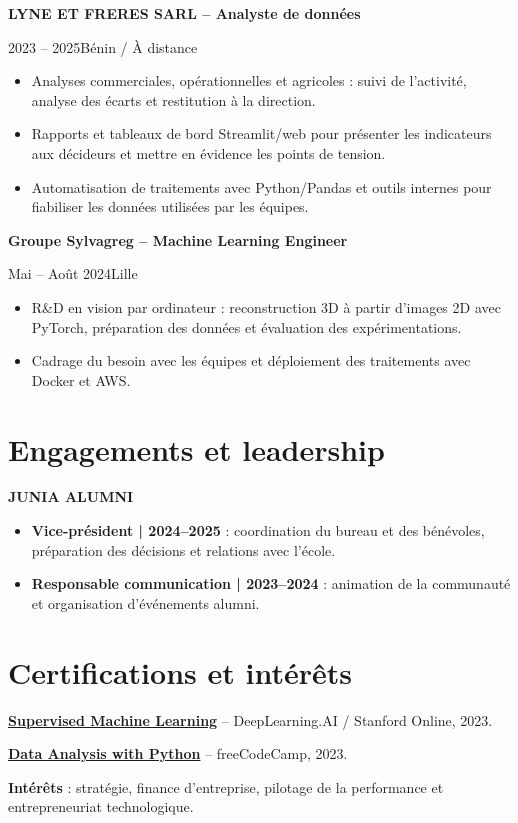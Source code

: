 \documentclass[10pt,a4paper]{article}
\newcommand{\role}[3]{\vspace{4pt}\textbf{#1}\par {\color{muted}#2\enspace\textbullet\enspace #3}\par}
\begin{document}
{\begin{minipage}[t]{0.68\textwidth}
\role{LYNE ET FRERES SARL -- Analyste de données}{2023 -- 2025}{Bénin / À distance}
\begin{itemize}
\item Analyses commerciales, opérationnelles et agricoles : suivi de l'activité, analyse des écarts et restitution à la direction.
\item Rapports et tableaux de bord Streamlit/web pour présenter les indicateurs aux décideurs et mettre en évidence les points de tension.
\item Automatisation de traitements avec Python/Pandas et outils internes pour fiabiliser les données utilisées par les équipes.
\end{itemize}

\role{Groupe Sylvagreg -- Machine Learning Engineer}{Mai -- Août 2024}{Lille}
\begin{itemize}
\item R\&D en vision par ordinateur : reconstruction 3D à partir d'images 2D avec PyTorch, préparation des données et évaluation des expérimentations.
\item Cadrage du besoin avec les équipes et déploiement des traitements avec Docker et AWS.
\end{itemize}

\section{Engagements et leadership}
\textbf{JUNIA ALUMNI}\par
\begin{itemize}
\item \textbf{Vice-président | 2024--2025} : coordination du bureau et des bénévoles, préparation des décisions et relations avec l'école.
\item \textbf{Responsable communication | 2023--2024} : animation de la communauté et organisation d'événements alumni.
\end{itemize}

\section{Certifications et intérêts}
\href{https://www.coursera.org/account/accomplishments/verify/MWJS4Q3S2C3L}{\textbf{Supervised Machine Learning}} -- DeepLearning.AI / Stanford Online, 2023.\par
\href{https://www.freecodecamp.org/certification/amiche/data-analysis-with-python-v7}{\textbf{Data Analysis with Python}} -- freeCodeCamp, 2023.\par
\vspace{3pt}
\textbf{Intérêts} : stratégie, finance d'entreprise, pilotage de la performance et entrepreneuriat technologique.
\end{minipage}}
\end{document}
